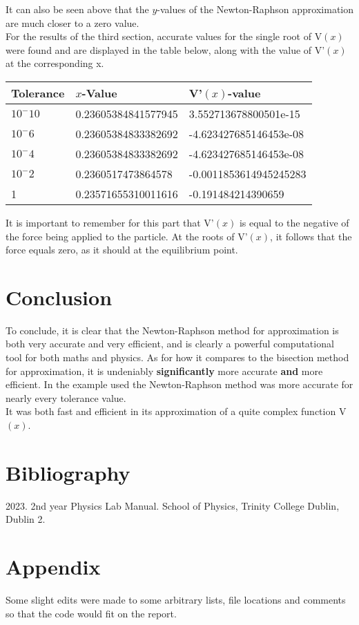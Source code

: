 \documentclass{article}
\begin{document}
It can also be seen above that the $y$-values of the Newton-Raphson approximation are much closer to a zero value.\\
For the results of the third section, accurate values for the single root of V$(x)$ were found and are displayed in the table below, along with the value of V'$(x)$ at the corresponding x.
\begin{table}[H]
	\begin{tabular}{|l|l|l|}
	\hline
	Tolerance & $x$-Value & V'$(x)$-value \\ \hline
	$10^-10$ & 0.23605384841577945 & 3.552713678800501e-15 \\ \hline
	$10^-6$ & 0.23605384833382692 & -4.623427685146453e-08 \\ \hline
	$10^-4$ & 0.23605384833382692 & -4.623427685146453e-08 \\ \hline
	$10^-2$ & 0.2360517473864578 & -0.0011853614945245283 \\ \hline
	1 & 0.23571655310011616 & -0.191484214390659 \\
	\hline
	\end{tabular}
\end{table}
It is important to remember for this part that V'$(x)$ is equal to the negative of the force being applied to the particle. At the roots of V'$(x)$, it follows that the force equals zero, as it should at the equilibrium point.
\section{Conclusion}
To conclude, it is clear that the Newton-Raphson method for approximation is both very accurate and very efficient, and is clearly a powerful computational tool for both maths and physics. As for how it compares to the bisection method for approximation, it is undeniably \textbf{significantly} more accurate \textbf{and} more efficient. In the example used the Newton-Raphson method was more accurate for nearly every tolerance value.\\
It was both fast and efficient in its approximation of a quite complex function V$(x)$.
\section{Bibliography}
2023. 2nd year Physics Lab Manual. School of Physics, Trinity College Dublin, Dublin 2.

\section{Appendix}
Some slight edits were made to some arbitrary lists, file locations and comments so that the code would fit on the report.
\end{document}
